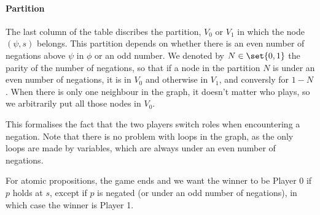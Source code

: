 \begin{definition}
    \paragraph{Partition}
    The last column of the table discribes the partition, $V_0$ or $V_1$
    in which the node $(\psi, s)$ belongs. This partition depends on whether
    there is an even number of negations above $\psi$ in $\phi$ or an odd number.
    We denoted by $N \in \set{0, 1}$ the parity of the number of negations,
    so that if a node in the partition $N$ is under an even number of negations,
    it is in $V_0$ and otherwise in $V_1$, and conversly for $1 -N$.
    When there is only one neighbour in the graph, it doesn't matter who plays,
    so we arbitrarily put all those nodes in $V_0$.

    This formalises the fact that the two players switch roles when encountering
    a negation.
    Note that there is no problem with loops in the graph, as the only loops
    are made by variables, which are always under an even number of negations.

    For atomic propositions, the game ends and we want the winner to be Player 0 if $p$ holds at $s$,
    except if $p$ is negated (or under an odd number of negations), in which case the winner is Player 1.


\end{definition}
